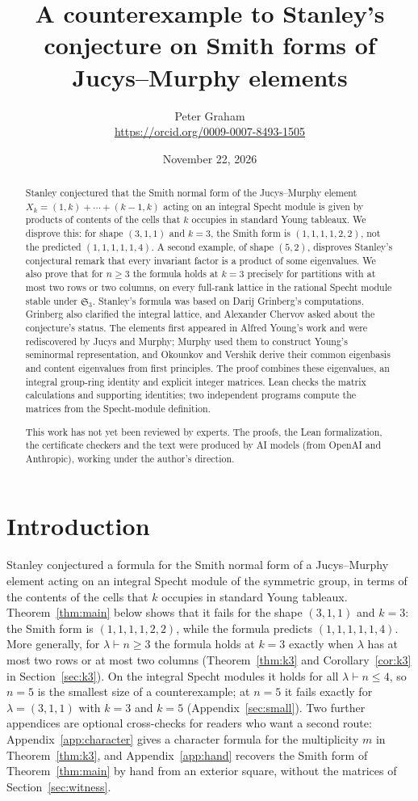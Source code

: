 \documentclass[11pt]{article}
\title{A counterexample to Stanley's conjecture on Smith forms of Jucys--Murphy elements}
\author{Peter Graham\\ \small\url{https://orcid.org/0009-0007-8493-1505}}
\date{November 22, 2026}
\theoremstyle{remark}
\begin{document}
\maketitle
\begin{abstract}
Stanley conjectured that the Smith normal form of the Jucys--Murphy element
$X_k=(1,k)+\cdots+(k-1,k)$ acting on an integral Specht module is given by
products of contents of the cells that $k$ occupies in standard Young
tableaux. We disprove this: for shape $(3,1,1)$ and $k=3$, the Smith form is
$(1,1,1,1,2,2)$, not the predicted $(1,1,1,1,1,4)$. A second example, of
shape $(5,2)$, disproves Stanley's conjectural remark that every invariant
factor is a product of some eigenvalues. We also prove that for $n\ge3$ the
formula holds at $k=3$ precisely for partitions with at most two rows or two
columns, on every full-rank lattice in the rational Specht module stable
under $\mathfrak S_3$.
Stanley's formula was based on Darij Grinberg's computations. Grinberg also
clarified the integral lattice, and Alexander Chervov asked about the
conjecture's status. The elements first appeared in Alfred Young's work and
were rediscovered by Jucys and Murphy; Murphy used them to construct Young's
seminormal representation, and Okounkov and Vershik derive their common
eigenbasis and content eigenvalues from first principles. The proof
combines these eigenvalues, an integral group-ring identity and explicit
integer matrices. Lean checks the matrix calculations and supporting
identities; two independent programs compute the matrices from the
Specht-module definition.

This work has not yet been reviewed by experts. The proofs, the Lean formalization, the certificate checkers and the text were produced by AI models (from OpenAI and Anthropic), working under the author's direction.
\end{abstract}
\medskip

\section{Introduction}\label{sec:reading}
Stanley conjectured a formula for the Smith normal form of a Jucys--Murphy
element acting on an integral Specht module of the symmetric group, in terms
of the contents of the cells that $k$ occupies in standard Young tableaux.
Theorem~\ref{thm:main} below shows that it fails for the shape $(3,1,1)$ and
$k=3$: the Smith form is $(1,1,1,1,2,2)$, while the formula predicts
$(1,1,1,1,1,4)$. More generally, for $\lambda\vdash n\ge3$ the formula holds at
$k=3$ exactly when $\lambda$ has at most two rows or at most two columns
(Theorem~\ref{thm:k3} and Corollary~\ref{cor:k3} in Section~\ref{sec:k3}). On
the integral Specht modules it holds for all $\lambda\vdash n\le4$, so $n=5$ is
the smallest size of a counterexample; at $n=5$ it fails exactly for
$\lambda=(3,1,1)$ with $k=3$ and $k=5$ (Appendix~\ref{sec:small}).
Two further appendices are optional cross-checks for readers who want a
second route: Appendix~\ref{app:character} gives a character formula for
the multiplicity $m$ in Theorem~\ref{thm:k3}, and Appendix~\ref{app:hand}
recovers the Smith form of Theorem~\ref{thm:main} by hand from an exterior
square, without the matrices of Section~\ref{sec:witness}.
\end{document}

